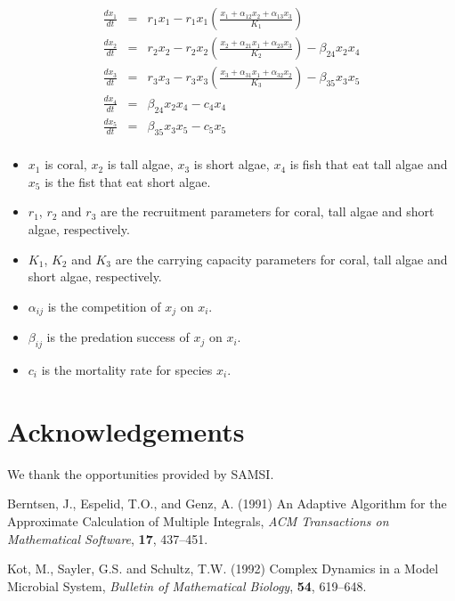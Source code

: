 \documentclass[11pt,twoside]{article}
\numberwithin{equation}{section}
\begin{document}
\begin{eqnarray*}
\frac{d x_1}{dt} &=& r_1 x_1 - r_1 x_1 \left( \frac{ x_1 + \alpha_{12} x_2 + \alpha_{13} x_3}{K_1} \right)  \\
\frac{d x_2}{dt} &=& r_2 x_2 - r_2 x_2 \left( \frac{ x_2 + \alpha_{21} x_1 + \alpha_{23} x_3}{K_2} \right) - \beta_{24} x_2 x_4  \\
\frac{d x_3}{dt} &=& r_3 x_3 - r_3 x_3 \left( \frac{ x_3 + \alpha_{31} x_1 + \alpha_{32} x_2}{K_3} \right) - \beta_{35} x_3 x_5   \\
\frac{d x_4}{dt} &=& \beta_{24} x_2 x_4  - c_4 x_4 \\
\frac{d x_5}{dt} &=& \beta_{35} x_3 x_5  - c_5 x_5 \\
\end{eqnarray*}
\begin{itemize}
  \item $x_1$ is coral, $x_2$ is tall algae, $x_3$ is short algae, $x_4$ is fish that eat tall algae and $x_5$ is the fist that eat short algae.  
  \item $r_1$, $r_2$ and $r_3$ are the recruitment parameters for coral, tall algae and short algae, respectively.
  \item $K_1$, $K_2$ and $K_3$ are the carrying capacity parameters for coral, tall algae and short algae, respectively.
  \item $\alpha_{ij}$ is the competition of $x_j$ on $x_i$.
  \item $\beta_{ij}$ is the predation success of $x_j$ on $x_i$.
  \item $c_i$ is the mortality rate for species $x_i$.
\end{itemize}
\section*{Acknowledgements}
We thank the opportunities provided by SAMSI. 

\begin{thebibliography}{}
Berntsen, J., Espelid, T.O., and Genz, A. (1991) An Adaptive Algorithm for the Approximate Calculation 
of Multiple Integrals, {\it ACM Transactions on Mathematical Software}, {\bf 17}, 437--451.

Kot, M., Sayler, G.S. and Schultz, T.W. (1992) Complex Dynamics in a Model Microbial System, {\it Bulletin of Mathematical Biology}, {\bf 54}, 619--648.
\end{thebibliography}
\end{document}
